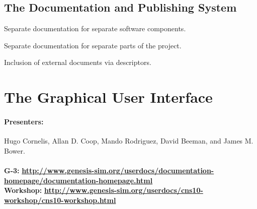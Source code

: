\documentclass[12pt]{article}
\begin{document}
\subsection{The Documentation and Publishing System}

Separate documentation for separate software components.

Separate documentation for separate parts of the project.

Inclusion of external documents via descriptors.



\section{The Graphical User Interface}


\paragraph*{Presenters:}
Hugo Cornelis, Allan D. Coop, Mando Rodriguez, David Beeman, and James M. Bower. \\

 \\
{\bf G-3:} {\scriptsize \href{http://www.genesis-sim.org/userdocs/documentation-homepage/documentation-homepage.html}{\bf http://www.genesis-sim.org/userdocs/documentation-homepage/documentation-homepage.html}} \\
{\bf Workshop:} {\scriptsize \href{http://www.genesis-sim.org/userdocs/cns10-workshop/cns10-workshop.html}{\bf http://www.genesis-sim.org/userdocs/cns10-workshop/cns10-workshop.html}}
\end{document}
